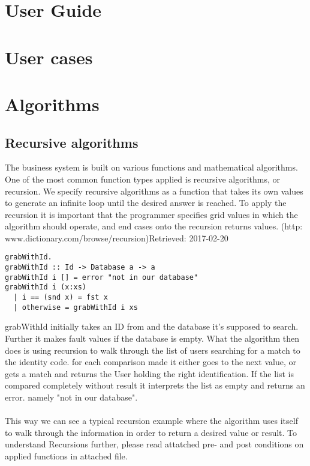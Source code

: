 \documentclass[11pt]{article}
\begin{document}
\section{User Guide}
\section{User cases}
\section{Algorithms}
\subsection{Recursive algorithms}
The business system is built on various functions and mathematical algorithms. One of the most common function types applied is recursive algorithms, or recursion. We specify recursive algorithms as a function that takes its own values to generate an infinite loop until the desired answer is reached. To apply the recursion it is important that the programmer specifies grid values in which the algorithm should operate, and end cases onto the recursion returns values. (http:\\www.dictionary.com/browse/recursion)Retrieved: 2017-02-20 \\
\begin{lstlisting}
grabWithId.
grabWithId :: Id -> Database a -> a
grabWithId i [] = error "not in our database"
grabWithId i (x:xs)
  | i == (snd x) = fst x
  | otherwise = grabWithId i xs
\end{lstlisting}
grabWithId initially takes an ID from and the database it’s supposed to search. Further it makes fault values if the database is empty. What the algorithm then does is using recursion to walk through the list of users searching for a match to the identity code. for each comparison made it either goes to the next value, or gets a match and returns the User holding the right identification. If the list is compared completely without result it interprets the list as empty and returns an error. namely "not in our database".\\
\\
This way we can see a typical recursion example where the algorithm uses itself to walk through the information in order to return a desired value or result.
To understand Recursions further, please read attatched pre- and post conditions on applied functions in attached file.\\
\end{document}
